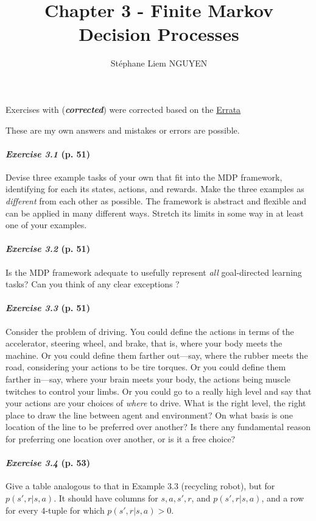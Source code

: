 \documentclass[10pt,a4paper]{article}
\title{Chapter 3 - Finite Markov Decision Processes}
\author{Stéphane Liem NGUYEN}
\begin{document}
\maketitle

Exercises with (\textbf{\textit{corrected}}) were corrected based on the \href{http://incompleteideas.net/book/errata.html}{Errata}

These are my own answers and mistakes or errors are possible.

\paragraph{\textit{Exercise 3.1} (p. 51)} Devise three example tasks of your own that fit into the MDP framework, identifying for each its states, actions, and rewards. Make the three examples as \textit{different} from each other as possible. The framework is abstract and flexible and can be applied in
many different ways. Stretch its limits in some way in at least one of your examples.

\paragraph{\textit{Exercise 3.2} (p. 51)} Is the MDP framework adequate to usefully represent \textit{all} goal-directed learning tasks? Can you think of any clear exceptions ?

\paragraph{\textit{Exercise 3.3} (p. 51)} Consider the problem of driving. You could define the actions in terms of the accelerator, steering wheel, and brake, that is, where your body meets the machine.
Or you could define them farther out---say, where the rubber meets the road, considering your actions to be tire torques.
Or you could define them farther in---say, where your brain meets your body, the actions being muscle twitches to control your limbs.
Or you could go to a really high level and say that your actions are your choices of \textit{where} to drive.
What is the right level, the right place to draw the line between agent and environment?
On what basis is one location of the line to be preferred over another? Is there any
fundamental reason for preferring one location over another, or is it a free choice?

\paragraph{\textit{Exercise 3.4} (p. 53)} Give a table analogous to that in Example $3.3$ (recycling robot), but for $p(s', r \lvert s, a)$. It should have columns for $s, a, s', r$, and $p(s', r|s, a)$, and a row for every $4$-tuple for which $p(s', r \lvert s, a) > 0$.
\end{document}
